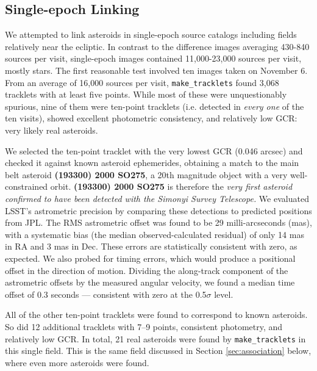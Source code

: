 \subsection{Single-epoch Linking}
\label{sec:linking}

We attempted to link asteroids in single-epoch source catalogs including fields relatively near the ecliptic. In contrast to the difference images averaging 430-840 sources per visit, single-epoch images contained 11,000-23,000 sources per visit, mostly stars. The first reasonable test involved ten images taken on November 6. From an average of 16,000 sources per visit, {\tt make\_tracklets} found 3,068 tracklets with at least five points. While most of these were unquestionably spurious, nine of them were ten-point tracklets (i.e. detected in {\em every one} of the ten visits), showed excellent photometric consistency, and relatively low GCR: very likely real asteroids.

We selected the ten-point tracklet with the very lowest GCR (0.046 arcsec) and checked it against known asteroid ephemerides, obtaining a match to the main belt asteroid \textbf{(193300) 2000 SO275}, a 20th magnitude object with a very well-constrained orbit. \textbf{(193300) 2000 SO275} is therefore the {\em very first asteroid confirmed to have been detected with the Simonyi Survey Telescope.} We evaluated LSST's astrometric precision by comparing these detections to predicted positions from JPL. The RMS astrometric offset was found to be 29 milli-arcseconds (mas), with a systematic bias (the median observed-calculated residual) of only 14 mas in RA and 3 mas in Dec. These errors are statistically consistent with zero, as expected. We also probed for timing errors, which would produce a positional offset in the direction of motion. Dividing the along-track component of the astrometric offsets by the measured angular velocity, we found a median time offset of 0.3 seconds --- consistent with zero at the 0.5$\sigma$ level.

All of the other ten-point tracklets were found to correspond to known asteroids. So did 12 additional tracklets with 7--9 points, consistent photometry, and relatively low GCR. In total, 21 real asteroids were found by {\tt make\_tracklets} in this single field. This is the same field discussed in Section \ref{sec:association} below, where even more asteroids were found.
